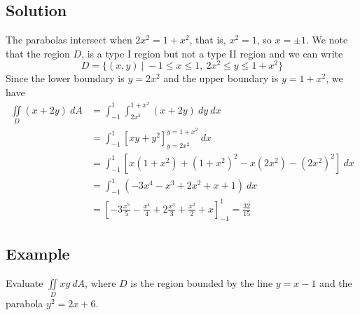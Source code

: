 \subsection*{Solution}
The parabolas intersect when $2x^2=1+x^2$, that is, $x^2=1$, so $x=\pm 1$. We note
that the region $D$, is a type I region but not a type II region and we can write
$$D=\{(x,y)\:|\: -1\leq x\leq 1,\: 2x^2\leq y\leq 1+x^2\}$$
Since the lower boundary is $y=2x^2$ and the upper boundary is $y=1+x^2$, we have
\begin{align*}
    \iint\limits_D(x+2y)\:dA & =\int_{-1}^1\int_{2x^2}^{1+x^2} (x+2y)\:dy\:dx                                                  \\
                             & =\int_{-1}^1\left[xy+y^2\right]_{y=2x^2}^{y=1+x^2}\:dx                                          \\
                             & =\int_{-1}^1\left[x(1+x^2)+(1+x^2)^2-x(2x^2)-(2x^2)^2\right]\:dx                                \\
                             & =\int_{-1}^1(-3x^4-x^3+2x^2+x+1)\:dx                                                            \\
                             & =\left[-3\frac{x^5}{5}-\frac{x^4}{4}+2\frac{x^3}{3}+\frac{x^2}{2}+x\right]_{-1}^1=\frac{32}{15}
\end{align*}

\subsection*{Example}
Evaluate $\iint\limits_D xy\:dA$, where $D$ is the region bounded by the line $y=x-1$
and the parabola $y^2=2x+6$.


